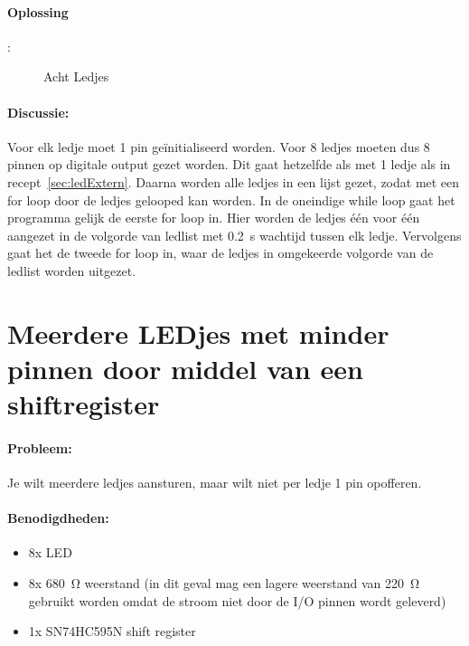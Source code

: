 	\paragraph{Oplossing}:
	\begin{figure}[H]
		\caption{Acht Ledjes}
		\label{fig:MultipleLED}
	\end{figure}
\newpage
	
	\paragraph{Discussie:} Voor elk ledje moet 1 pin ge\"initialiseerd worden. Voor 8 ledjes moeten dus 8 pinnen op digitale output gezet worden. Dit gaat hetzelfde als met 1 ledje als in recept~\ref{sec:ledExtern}. Daarna worden alle ledjes in een lijst gezet, zodat met een for loop door de ledjes gelooped kan worden. In de oneindige while loop gaat het programma gelijk de eerste for loop in. Hier worden de ledjes \'e\'en voor \'e\'en aangezet in de volgorde van ledlist met \SI{0.2}{\second} wachtijd tussen elk ledje. Vervolgens gaat het de tweede for loop in, waar de ledjes in omgekeerde volgorde van de ledlist worden uitgezet. 

\newpage
\section{Meerdere LEDjes met minder pinnen door middel van een shiftregister}
	\paragraph{Probleem:} Je wilt meerdere ledjes aansturen, maar wilt niet per ledje 1 pin opofferen.
	\paragraph{Benodigdheden:}
		\begin{itemize}
			\item 8x LED
			\item 8x \SI{680}{\ohm} weerstand (in dit geval mag een lagere weerstand van \SI{220}{\ohm} gebruikt worden omdat de stroom niet door de I/O pinnen wordt geleverd)
			\item 1x SN74HC595N shift register
		\end{itemize}
